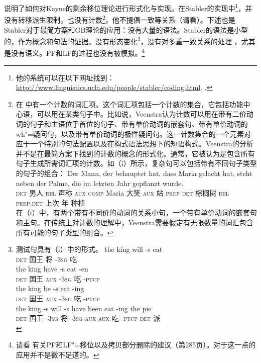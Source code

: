  \citet{Stabler2001a}说明了如何对Kayne的剩余移位理论进行形式化与实现。在Stabler的实现中\footnote{%
他的系统可以在以下网址找到：
\url{http://www.linguistics.ucla.edu/people/stabler/coding.html}. .
}，并没有转移派生限制，也没有计数\footnote{%
在 \citet[\S~9]{Veenstra98a}中有一个计数的词汇项。这个词汇项包括一个计数的集合，它包括功能中心语，可以用在某类句子中。比如说，Veenstra认为计数可以用在带有二价动词的句子和主语位于首位的句子、带有单价动词的嵌套句、带有单价动词的wh"=疑问句，以及带有单价动词的极性疑问句。这一计数集合的一个元素对应于一个特别的句法配置以及在构式语法\indexcxgc 思想下的短语构式。Veenstra的分析并不是在最简方案下找到的计数的概念的形式化。通常，它被认为是包含所有句子生成所需词汇项的计数。如（i）所示，复杂句可以包括带有不同句子类型的句子的组合：
\ea
\gll Der          Mann, der         behauptet hat,         dass          Maria gelacht hat,         steht neben        der          Palme, die im letzten Jahr gepflanzt wurde.\\
     \textsc{det} 男人  \textsc{rel} 声称      \textsc{aux} \textsc{comp} Maria 大笑     \textsc{aux} 站   \textsc{prep} \textsc{det} 棕榈树 \textsc{rel} \textsc{prep}.\textsc{det} 上次 年 种植 \passivepst{}\\
\z
在（i）中，有两个带有不同价的动词的关系小句，一个带有单价动词的嵌套句和主句。在传统上对计数的理解中，Veenstra需要假定有无限数量的词汇包含所有可能的句子类型的组合。
}，他不提倡一致等关系（请看\citealp[]{Fong2014a}）。下述也是Stabler对于最简方案\indexmgc 和GB理论的应用：没有大量的语法。Stabler的语法是小型的，作为概念和句法的证据。没有形态变化\footnote{%
测试句具有（i）中的形式。
\eal
\ex 
\gll the king will -s eat\\
	\textsc{det} 国王 将 -\textsc{3sg} 吃\\
\ex 
\gll the king have -s eat -en\\
	\textsc{det} 国王 \textsc{aux} -\textsc{3sg} 吃 -\textsc{ptcp}\\
\ex 
\gll the king be -s eat -ing\\
	\textsc{det} 国王 \textsc{aux} -\textsc{3sg} 吃 -\textsc{ptcp}\\
\ex 
\gll the king -s will -s have been eat -ing the pie\\
	\textsc{det} 国王 -\textsc{3sg} 将 -\textsc{3sg} \textsc{aux} \textsc{aux} 吃 -\textsc{ptcp} \textsc{det} 派\\
\zllast
}，没有对多重一致关系的处理 \citep[\S~27.4.3]{Stabler2010b}，尤其是没有语义。PF和LF的过程也没有被模拟。\footnote{%
	请看 \citet{SE2002a}有关PF和LF"=移位以及拷贝部分删除的建议（第285页）。对于这一点的应用并不是微不足道的。
}
